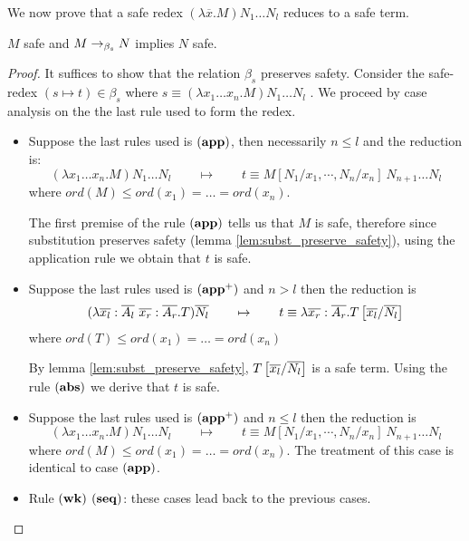 We now prove that a safe redex $(\lambda \overline{x} . M) N_1 \ldots N_l$ reduces to a safe term.

\begin{lem}
$M$ safe and $M \rightarrow_{\beta_s} N$ implies $N$ safe.
\end{lem}

\begin{proof}
It suffices to show that the relation $\beta_s$ preserves safety.
Consider the safe-redex $(s\mapsto t) \in \beta_s$ where $ s \equiv (\lambda x_1 \ldots x_n . M) N_1 \ldots N_l $ .
We proceed by case analysis on the the last rule used to form the redex.
\begin{itemize}
\item Suppose the last rules used is $\mathbf{(app)}$, then necessarily $n\leq l$ and the reduction is:
$$(\lambda x_1 \ldots x_n . M) N_1 \ldots N_l \qquad \mapsto  \qquad t \equiv M[N_1 / x_1 , \cdots, N_n / x_n]\ N_{n+1} \ldots N_l$$
where $ord(M) \leq ord(x_1) = \ldots = ord(x_n)$.

The first premise of the rule $\mathbf{(app)}$ tells us that $M$ is safe,
therefore since substitution preserves safety (lemma
\ref{lem:subst_preserve_safety}), using the application rule we obtain that $t$ is safe.

\item Suppose the last rules used is $\mathbf{(app^+)}$ and $n> l$ then the reduction is
$$ (\lambda \overline{x_l} : \overline{A_l} \
\overline{x_r}: \overline{A_r} . T) \overline{N_l} \qquad \mapsto
\qquad t \equiv \lambda \overline{x_r}: \overline{A_r} .
T\left[ \overline{x_l}/\overline{N_l} \right]
$$
where $ord(T) \leq ord(x_1) = \ldots = ord(x_n)$

By lemma \ref{lem:subst_preserve_safety}, $T\left[ \overline{x_l}/\overline{N_l} \right]$ is a safe term.
Using the rule $\mathbf{(abs)}$ we derive that $t$ is safe.

\item Suppose the last rules used is $\mathbf{(app^+)}$ and $n\leq l$ then the reduction is
$$(\lambda x_1 \ldots x_n . M) N_1 \ldots N_l \qquad \mapsto \qquad t \equiv M[N_1 / x_1 , \cdots, N_n / x_n]\ N_{n+1} \ldots N_l$$
where $ord(M) \leq ord(x_1) = \ldots = ord(x_n)$. The treatment of this case is identical to case $\mathbf{(app)}$.

\item Rule $\mathbf{(wk)}$ $\mathbf{(seq)}$: these cases lead back to the previous cases.
\end{itemize}
\end{proof}


